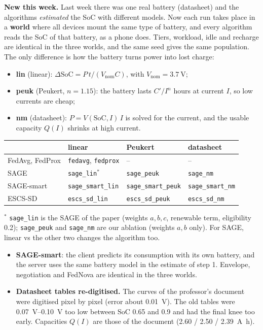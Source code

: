 \documentclass[11pt,a4paper]{article}
\begin{document}
\textbf{New this week.} Last week there was one real battery (datasheet) and
the algorithms \emph{estimated} the SoC with different models. Now each run
takes place in a \textbf{world} where all devices mount the same type of
battery, and every algorithm reads the SoC of that battery, as a phone does.
Tiers, workload, idle and recharge are identical in the three worlds, and the
same seed gives the same population. The only difference is how the battery
turns power into lost charge:

\begin{itemize}
  \item \textbf{lin} (linear): $\Delta\mathrm{SoC} = P\,t / (V_{\text{nom}} C)$,
        with $V_{\text{nom}} = \SI{3.7}{\volt}$;
  \item \textbf{peuk} (Peukert, $n = 1.15$): the battery lasts $C'/I^{n}$ hours
        at current $I$, so low currents are cheap;
  \item \textbf{nm} (datasheet): $P = V(\mathrm{SoC}, I)\,I$ is solved for the
        current, and the usable capacity $Q(I)$ shrinks at high current.
\end{itemize}

\begin{center}
\begin{tabular}{llll}
\toprule
 & linear & Peukert & datasheet \\
\midrule
FedAvg, FedProx & \texttt{fedavg}, \texttt{fedprox} & -- & -- \\
SAGE            & \texttt{sage\_lin}$^{*}$  & \texttt{sage\_peuk}        & \texttt{sage\_nm} \\
SAGE-smart      & \texttt{sage\_smart\_lin} & \texttt{sage\_smart\_peuk} & \texttt{sage\_smart\_nm} \\
ESCS-SD         & \texttt{escs\_sd\_lin}    & \texttt{escs\_sd\_peuk}    & \texttt{escs\_sd\_nm} \\
\bottomrule
\end{tabular}

\smallskip
{\footnotesize $^{*}$ \texttt{sage\_lin} is the SAGE of the paper (weights
$a,b,c$, renewable term, eligibility 0.2); \texttt{sage\_peuk} and
\texttt{sage\_nm} are our ablation (weights $a,b$ only). For SAGE, linear vs
the other two changes the algorithm too.}
\end{center}

\begin{itemize}
  \item \textbf{SAGE-smart}: the client predicts its consumption with its own
        battery, and the server uses the same battery model in the estimate of
        step 1. Envelope, negotiation and FedNova are identical in the three
        worlds.
  \item \textbf{Datasheet tables re-digitised.} The curves of the professor's
        document were digitised pixel by pixel (error about \SI{0.01}{\volt}).
        The old tables were \SIrange{0.07}{0.10}{\volt} too low between SoC 0.65
        and 0.9 and had the final knee too early. Capacities $Q(I)$ are those of
        the document (2.60 / 2.50 / \SI{2.39}{\ampere\hour}).
\end{itemize}
\end{document}
